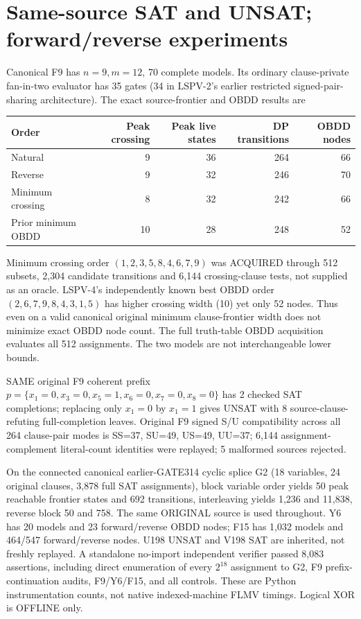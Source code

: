 \documentclass[11pt]{article}
\begin{document}
\section{Same-source SAT and UNSAT; forward/reverse experiments}
\noindent Canonical F9 has $n=9,m=12$, 70 complete models. Its ordinary clause-private fan-in-two evaluator has 35 gates (34 in LSPV-2's earlier restricted signed-pair-sharing architecture). The exact source-frontier and OBDD results are
\begin{center}\begin{tabular}{lrrrr}\toprule
Order&Peak crossing&Peak live states&DP transitions&OBDD nodes\\\midrule
Natural&9&36&264&66\\
Reverse&9&32&246&70\\
Minimum crossing&8&32&242&66\\
Prior minimum OBDD&10&28&248&52\\\bottomrule
\end{tabular}\end{center}
\noindent Minimum crossing order $(1,2,3,5,8,4,6,7,9)$ was ACQUIRED through 512 subsets, 2,304 candidate transitions and 6,144 crossing-clause tests, not supplied as an oracle. LSPV-4's independently known best OBDD order $(2,6,7,9,8,4,3,1,5)$ has higher crossing width (10) yet only 52 nodes. Thus even on a valid canonical original minimum clause-frontier width does not minimize exact OBDD node count. The full truth-table OBDD acquisition evaluates all 512 assignments. The two models are not interchangeable lower bounds.

\noindent SAME original F9 coherent prefix $p=\{x_1=0,x_3=0,x_5=1,x_6=0,x_7=0,x_8=0\}$ has 2 checked SAT completions; replacing only $x_1=0$ by $x_1=1$ gives UNSAT with 8 source-clause-refuting full-completion leaves. Original F9 signed S/U compatibility across all 264 clause-pair modes is SS=37, SU=49, US=49, UU=37; 6,144 assignment-complement literal-count identities were replayed; 5 malformed sources rejected.

\noindent On the connected canonical earlier-GATE314 cyclic splice G2 (18 variables, 24 original clauses, 3,878 full SAT assignments), block variable order yields 50 peak reachable frontier states and 692 transitions, interleaving yields 1,236 and 11,838, reverse block 50 and 758. The same ORIGINAL source is used throughout. Y6 has 20 models and 23 forward/reverse OBDD nodes; F15 has 1,032 models and 464/547 forward/reverse nodes. U198 UNSAT and V198 SAT are inherited, not freshly replayed. A standalone no-import independent verifier passed 8,083 assertions, including direct enumeration of every $2^{18}$ assignment to G2, F9 prefix-continuation audits, F9/Y6/F15, and all controls. These are Python instrumentation counts, not native indexed-machine FLMV timings. Logical XOR is OFFLINE only.
\end{document}
